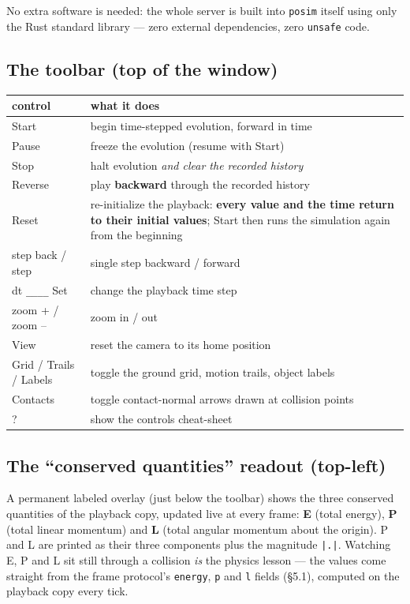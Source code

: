 \documentclass[11pt]{article}
\newcommand{\code}[1]{\texttt{#1}}
\begin{document}
No extra software is needed: the whole server is built into
\code{posim} itself using only the Rust standard library --- zero
external dependencies, zero \code{unsafe} code.

\subsection{The toolbar (top of the window)}

\begin{center}
\begin{tabular}{lp{9.2cm}}
\textbf{control} & \textbf{what it does}\\\hline
Start & begin time-stepped evolution, forward in time\\
Pause & freeze the evolution (resume with Start)\\
Stop & halt evolution \emph{and clear the recorded history}\\
Reverse & play \textbf{backward} through the recorded history\\
Reset & re-initialize the playback: \textbf{every value and the time return to their initial values}; Start then runs the simulation again from the beginning\\
step back / step & single step backward / forward\\
dt \code{\_\_\_\_} Set & change the playback time step\\
zoom + / zoom -- & zoom in / out\\
View & reset the camera to its home position\\
Grid / Trails / Labels & toggle the ground grid, motion trails, object labels\\
Contacts & toggle contact-normal arrows drawn at collision points\\
? & show the controls cheat-sheet\\
\end{tabular}
\end{center}

\subsection{The ``conserved quantities'' readout (top-left)}

A permanent labeled overlay (just below the toolbar) shows the three
conserved quantities of the playback copy, updated live at every
frame: \textbf{E} (total energy), \textbf{P} (total linear momentum)
and \textbf{L} (total angular momentum about the origin). P and L are
printed as their three components plus the magnitude \code{|.|}.
Watching E, P and L sit still through a collision \emph{is} the
physics lesson --- the values come straight from the frame protocol's
\code{energy}, \code{p} and \code{l} fields (\S5.1), computed on the
playback copy every tick.
\end{document}

